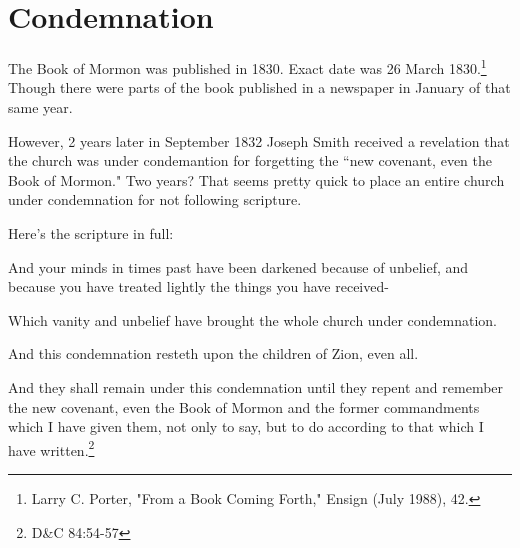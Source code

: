\chapter{Condemnation}

The Book of Mormon was published in 1830. Exact date was 26 March 1830.\footnote{
Larry C. Porter, "From a Book Coming Forth," Ensign (July 1988), 42.} Though there
were parts of the book published in a newspaper in January of that same year.

However, 2 years later in September 1832 Joseph Smith received a revelation that the
church was under condemantion for forgetting the ``new covenant, even the Book of
Mormon." Two years? That seems pretty quick to place an entire church under
condemnation for not following scripture.

Here's the scripture in full:

\begin{displayquote}
And your minds in times past have been darkened because of unbelief, and because you 
have treated lightly the things you have received-

Which vanity and unbelief have brought the whole church under condemnation.

And this condemnation resteth upon the children of Zion, even all.

And they shall remain under this condemnation until they repent and remember the new 
covenant, even the Book of Mormon and the former commandments which I have given 
them, not only to say, but to do according to that which I have written.\footnote{
D\&C 84:54-57
}
\end{displayquote}